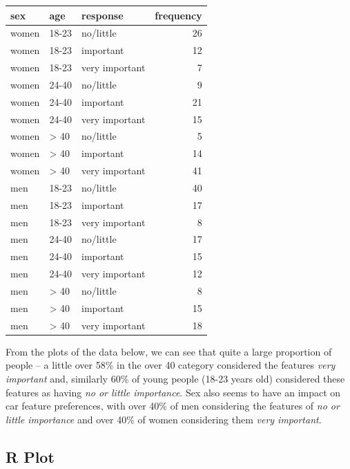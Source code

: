 \documentclass[
  letterpaper,
  DIV=11,
  numbers=noendperiod]{scrartcl}
\begin{document}
\begin{longtable}[]{@{}lllr@{}}
\toprule\noalign{}
sex & age & response & frequency \\
\midrule\noalign{}
\endhead
\bottomrule\noalign{}
\endlastfoot
women & 18-23 & no/little & 26 \\
women & 18-23 & important & 12 \\
women & 18-23 & very important & 7 \\
women & 24-40 & no/little & 9 \\
women & 24-40 & important & 21 \\
women & 24-40 & very important & 15 \\
women & \textgreater{} 40 & no/little & 5 \\
women & \textgreater{} 40 & important & 14 \\
women & \textgreater{} 40 & very important & 41 \\
men & 18-23 & no/little & 40 \\
men & 18-23 & important & 17 \\
men & 18-23 & very important & 8 \\
men & 24-40 & no/little & 17 \\
men & 24-40 & important & 15 \\
men & 24-40 & very important & 12 \\
men & \textgreater{} 40 & no/little & 8 \\
men & \textgreater{} 40 & important & 15 \\
men & \textgreater{} 40 & very important & 18 \\
\end{longtable}

From the plots of the data below, we can see that quite a large
proportion of people -- a little over 58\% in the over 40 category
considered the features \emph{very important} and, similarly 60\% of
young people (18-23 years old) considered these features as having
\emph{no or little importance}. Sex also seems to have an impact on car
feature preferences, with over 40\% of men considering the features of
\emph{no or little importance} and over 40\% of women considering them
\emph{very important}.

\subsection{R Plot}
\end{document}
